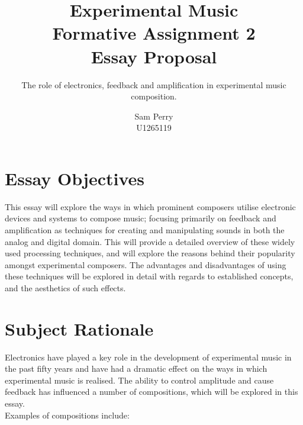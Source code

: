 \documentclass{scrartcl}
\begin{document}
    \title{Experimental Music\\Formative Assignment 2\\Essay Proposal\\}
    \author{Sam Perry\\U1265119}
    \subtitle{The role of electronics, feedback and amplification in
    experimental music composition.\\}
    \date{}
    \maketitle

    \section{Essay Objectives}
    This essay will explore the ways in which prominent composers utilise
    electronic devices and systems to compose music; focusing primarily on
    feedback and amplification as techniques for creating and manipulating
    sounds in both the analog and digital domain. This will provide a detailed
    overview of these widely used processing techniques, and will explore the
    reasons behind their popularity amongst experimental composers. The
    advantages and disadvantages of using these techniques will be explored in
    detail with regards to established concepts, and the aesthetics of such
    effects.

    \section{Subject Rationale}
    Electronics have played a key role in the development of experimental music
    in the past fifty years and have had a dramatic effect on the ways in which
    experimental music is realised. The ability to control amplitude and cause
    feedback has influenced a number of compositions, which will be explored in
    this essay.\\
    Examples of compositions include:
\end{document}
